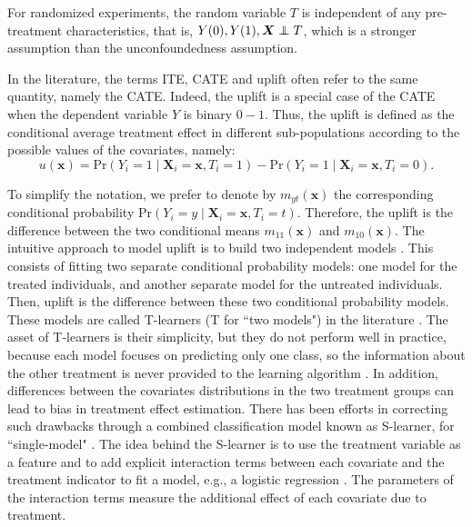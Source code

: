 \documentclass{article}
\newcommand\independent{\protect\mathpalette{\protect\independenT}{\perp}}
\def\independenT#1#2{\mathrel{\rlap{$#1#2$}\mkern2mu{#1#2}}}
\def\x{\mathbf x}
\begin{document}
For randomized experiments, the random variable $ T $ is independent of any pre-treatment characteristics, that is, $Y(0), Y(1), \boldsymbol X  \independent T$, which is a stronger assumption than the unconfoundedness assumption.


In the literature, the terms ITE, CATE and uplift often refer to the same quantity, namely the CATE. Indeed, the uplift is a special case of the CATE when the dependent variable $ Y $ is binary $ 0-1 $. Thus, the uplift is defined as the conditional average treatment effect in different sub-populations according to the possible values of the covariates, namely:
\begin{equation}
    u(\x) = \mathrm{Pr}(Y_i=1 \mid \boldsymbol X_i=\x, T_i=1) - \mathrm{Pr}(Y_i=1 \mid \boldsymbol X_i=\x, T_i=0).
    \label{def:uplift}
\end{equation}

To simplify the notation, we prefer to denote by $m_{yt}(\x)$ the corresponding conditional probability $\mathrm{Pr}(Y_i=y \mid \boldsymbol X_i=\x, T_i=t)$. Therefore, the uplift is the difference between the two conditional means $m_{11}(\x)$ and $m_{10}(\x)$. The intuitive approach to model uplift is to build two independent models \citep{hansotia2002direct}. This consists of fitting two separate conditional probability models: one model for the treated individuals, and another separate model for the untreated individuals. Then, uplift is the difference between these two conditional probability models. These models are called T-learners (T for ``two models") in the literature \citep{kunzel2019metalearners}. The asset of T-learners is their simplicity, but they do not perform well in practice, because each model focuses on predicting only  one class, so the information about the other treatment is never provided to the learning algorithm \citep{radcliffe2011real}. In addition, differences between the covariates distributions in the two treatment groups can lead to bias in treatment effect estimation. There has been efforts in correcting such drawbacks through a combined classification model known as S-learner, for ``single-model" \citep{kunzel2019metalearners}. The idea behind the S-learner is to use the treatment variable as a feature and to add explicit interaction terms between each covariate and the treatment indicator to  fit a model, e.g., a logistic regression \citep{lo2002true}. The parameters of the interaction terms measure the additional effect of each covariate due to treatment.
\end{document}
